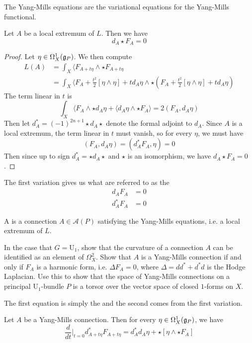 The Yang-Mills equations are the variational equations for the Yang-Mills
functional.
%
\begin{prop}
Let $A$ be a local extremum of $L$. Then we have
\[
d_A\star F_A = 0
\]
\end{prop}
%
\begin{proof}
Let $\eta \in \Omega^1_X(\mathfrak{g}_P)$. We then compute
\begin{align*}
L(A) &= \int_X \langle F_{A+t\eta}\wedge\star F_{A+t\eta} \\
&= \int_X\langle F_A + \frac{t^2}{2}[\eta\wedge\eta] + td_A\eta\wedge
\star(F_A + \frac{t^2}{2}[\eta\wedge\eta] + td_A\eta)
\end{align*}
The term linear in $t$ is
\[
\int_X \langle F_A\wedge\star d_A\eta + \langle d_A\eta\wedge\star F_A\rangle =
2(F_A,d_A\eta)
\]
Then let $d^*_A = (-1)^{2n+1}\star d_A\star$ denote the formal adjoint to
$d_A$. Since $A$ is a local extremum, the term linear in $t$ must vanish,
so for every $\eta$, we must have
\[
(F_A,d_A\eta) = (d^*_AF_A,\eta) = 0
\]
Then since up to sign $d^*_A = \star d_A \star$ and $\star$ is an isomorphism,
we have $d_A\star F_A = 0$.
\end{proof}
%
The first variation gives us what are referred to as the 
\begin{align*}
d_A F_A &= 0 \\
d_A^*F_A &= 0
\end{align*}
%
\begin{defn}
A  is a connection $A \in \mathscr{A}(P)$ satisfying
the Yang-Mills equations, i.e. a local extremum of $L$.
\end{defn}
%
\begin{exer}
In the case that $G = \mathrm{U}_1$, show that the curvature of a connection
$A$ can be identified as an element of $\Omega^2_X$. Show that $A$ is a
Yang-Mills connection if and only if $F_A$ is a harmonic form, i.e.
$\Delta F_A = 0$, where $\Delta = dd^* + d^*d$ is the Hodge Laplacian.
Use this to show that the space of Yang-Mills connections on a principal
$\mathrm{U}_1$-bundle $P$ is a torsor over the vector space of closed $1$-forms
on $X$.
\end{exer}
%
The first equation is simply the  and the second comes
from the first variation.
%
\begin{prop}
Let $A$ be a Yang-Mills connection. Then for every $\eta \in \Omega^1_X(\mathfrak{g}_P)$, we have
\[
\frac{d}{dt}\bigg\vert_{t=0}d^*_{A+t\eta}F_{A+t\eta} =
d^*_Ad_A\eta + \star[\eta\wedge\star F_A]
\]
\end{prop}
